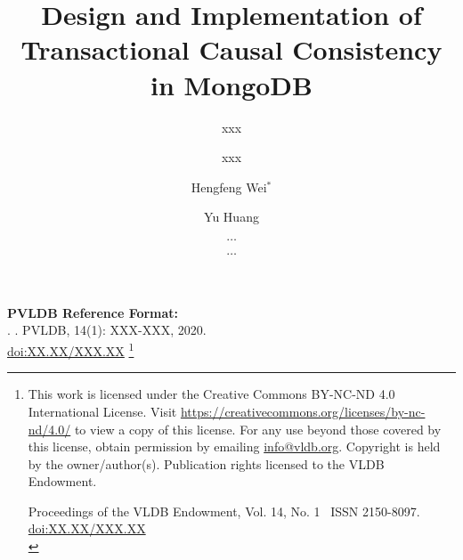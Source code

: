 \documentclass[sigconf, nonacm]{acmart}
\newcommand\vldbdoi{XX.XX/XXX.XX}
\newcommand\vldbpages{XXX-XXX}
\newcommand\vldbvolume{14}
\newcommand\vldbissue{1}
\newcommand\vldbyear{2020}
\newcommand\vldbauthors{\authors}
\newcommand\vldbtitle{\shorttitle}
\newcommand\vldbpagestyle{plain}
\begin{document}
\title{Design and Implementation of Transactional Causal Consistency in MongoDB}

\author{xxx}

\author{xxx}

\author{Hengfeng Wei$^*$}

\author{Yu Huang}

\author{$\dots$}
\affiliation{%
  \institution{}
}
\email{}

\author{$\dots$}
\affiliation{%
  \institution{}
}
\email{}



\maketitle

\pagestyle{\vldbpagestyle}
\begingroup\small\noindent\raggedright\textbf{PVLDB Reference Format:}\\
\vldbauthors. \vldbtitle. PVLDB, \vldbvolume(\vldbissue): \vldbpages, \vldbyear.\\
\href{https://doi.org/\vldbdoi}{doi:\vldbdoi}
\endgroup
\begingroup
\renewcommand\thefootnote{}\footnote{\noindent
This work is licensed under the Creative Commons BY-NC-ND 4.0 International License. Visit \url{https://creativecommons.org/licenses/by-nc-nd/4.0/} to view a copy of this license. For any use beyond those covered by this license, obtain permission by emailing \href{mailto:info@vldb.org}{info@vldb.org}. Copyright is held by the owner/author(s). Publication rights licensed to the VLDB Endowment. \\
\raggedright Proceedings of the VLDB Endowment, Vol. \vldbvolume, No. \vldbissue\ %
ISSN 2150-8097. \\
\href{https://doi.org/\vldbdoi}{doi:\vldbdoi} \\
}\addtocounter{footnote}{-1}\endgroup
\end{document}
